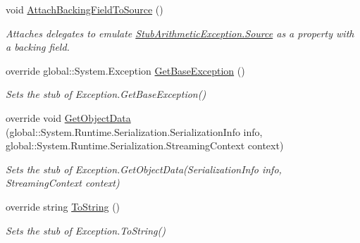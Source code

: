 \begin{DoxyCompactItemize}
void \hyperlink{class_system_1_1_fakes_1_1_stub_arithmetic_exception_a0b25b639d028181ece7ec50dc3a34fa1}{Attach\-Backing\-Field\-To\-Source} ()
\begin{DoxyCompactList}\small\item\em Attaches delegates to emulate \hyperlink{class_system_1_1_fakes_1_1_stub_arithmetic_exception_a659ee2153022c428d4b05332cfeba641}{Stub\-Arithmetic\-Exception.\-Source} as a property with a backing field.\end{DoxyCompactList}\item 
override global\-::\-System.\-Exception \hyperlink{class_system_1_1_fakes_1_1_stub_arithmetic_exception_a172a33fc6e3a5d6022d0dff81403ed9c}{Get\-Base\-Exception} ()
\begin{DoxyCompactList}\small\item\em Sets the stub of Exception.\-Get\-Base\-Exception()\end{DoxyCompactList}\item 
override void \hyperlink{class_system_1_1_fakes_1_1_stub_arithmetic_exception_acccbc22eddd90e570460cabd57a61035}{Get\-Object\-Data} (global\-::\-System.\-Runtime.\-Serialization.\-Serialization\-Info info, global\-::\-System.\-Runtime.\-Serialization.\-Streaming\-Context context)
\begin{DoxyCompactList}\small\item\em Sets the stub of Exception.\-Get\-Object\-Data(\-Serialization\-Info info, Streaming\-Context context)\end{DoxyCompactList}\item 
override string \hyperlink{class_system_1_1_fakes_1_1_stub_arithmetic_exception_af0b7776f6663ee617fe9c4290e719aaf}{To\-String} ()
\begin{DoxyCompactList}\small\item\em Sets the stub of Exception.\-To\-String()\end{DoxyCompactList}\end{DoxyCompactItemize}
